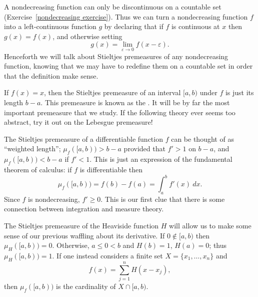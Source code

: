 \begin{subsec}
A nondecreasing function can only be discontinuous on a countable set (Exercise~\ref{nondecreasing exercise}).
Thus we can turn a nondecreasing function $f$ into a left-continuous function $g$ by declaring that if $f$ is continuous at $x$ then $g(x) = f(x)$, and otherwise setting
\[g(x) = \lim_{\varepsilon \to 0} f(x - \varepsilon).\]
Henceforth we will talk about Stieltjes premeasures of any nondecreasing function, knowing that we may have to redefine them on a countable set in order that the definition make sense.
\end{subsec}

\begin{example}
If $f(x) = x$, then the Stieltjes premeasure of an interval $[a, b)$ under $f$ is just its length $b - a$.
This premeasure is known as the .
It will be by far the most important premeasure that we study.
If the following theory ever seems too abstract, try it out on the Lebesgue premeasure!
\end{example}

\begin{example}
The Stieltjes premeasure of a differentiable function $f$ can be thought of as ``weighted length''; $\mu_f([a, b)) > b - a$ provided that $f' > 1$ on $b - a$, and $\mu_f([a, b)) < b - a$ if $f' < 1$.
This is just an expression of the fundamental theorem of calculus: if $f$ is differentiable then
\[\mu_f([a, b)) = f(b) - f(a) = \int_{a}^{b} f'(x)~dx.\]
Since $f$ is nondecreasing, $f' \geq 0$.
This is our first clue that there is some connection between integration and measure theory.
\end{example}

\begin{example}
The Stieltjes premeasure of the Heaviside function $H$ will allow us to make some sense of our previous waffling about its derivative.
If $0 \notin [a, b)$ then $\mu_H([a, b)) = 0$.
Otherwise, $a \leq 0 < b$ and $H(b) = 1$, $H(a) = 0$; thus $\mu_H([a, b)) = 1$.
If one instead considers a finite set $X = \{x_1, \dots, x_{n}\}$ and
\[f(x) = \sum_{j=1}^{n} H(x - x_{j}),\]
then $\mu_f([a, b))$ is the cardinality of $X \cap [a, b)$.
\end{example}

